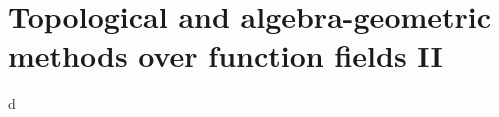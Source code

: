 
\section{Topological and algebra-geometric methods over function fields II}\label{sec:ellenberg-ii}





d

